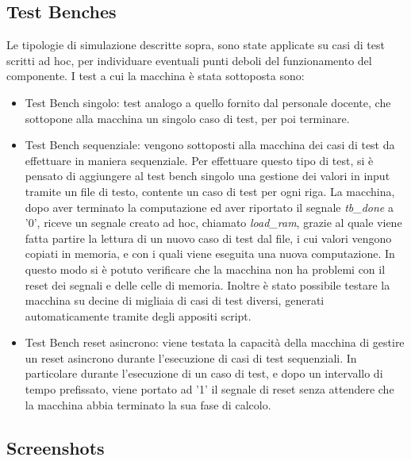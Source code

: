 \documentclass{article}
\begin{document}
\subsection{Test Benches}

Le tipologie di simulazione descritte sopra, sono state applicate su casi di test scritti ad hoc, per individuare eventuali punti deboli del funzionamento del componente. I test a cui la macchina è stata sottoposta sono:

\begin{itemize}

\item Test Bench singolo: test analogo a quello fornito dal personale docente, che sottopone alla macchina un singolo caso di test, per poi terminare.

\item Test Bench sequenziale: vengono sottoposti alla macchina dei casi di test da effettuare in maniera sequenziale. Per effettuare questo tipo di test, si è pensato di aggiungere al test bench singolo una gestione dei valori in input tramite un file di testo, contente un caso di test per ogni riga. La macchina, dopo aver terminato la computazione ed aver riportato il segnale \textit{tb{\_}done} a '0', riceve un segnale creato ad hoc, chiamato \textit{load{\_}ram}, grazie al quale viene fatta partire la lettura di un nuovo caso di test dal file, i cui valori vengono copiati in memoria, e con i quali viene eseguita una nuova computazione. In questo modo si è potuto verificare che la macchina non ha problemi con il reset dei segnali e delle celle di memoria. Inoltre è stato possibile testare la macchina su decine di migliaia di casi di test diversi, generati automaticamente tramite degli appositi script. 

\item Test Bench reset asincrono: viene testata la capacità della macchina di gestire un reset asincrono durante l'esecuzione di casi di test sequenziali. In particolare durante l'esecuzione di un caso di test, e dopo un intervallo di tempo prefissato, viene portato ad '1' il segnale di reset senza attendere che la macchina abbia terminato la sua fase di calcolo. 

\end{itemize}



\newpage
\subsection{Screenshots}
\end{document}
